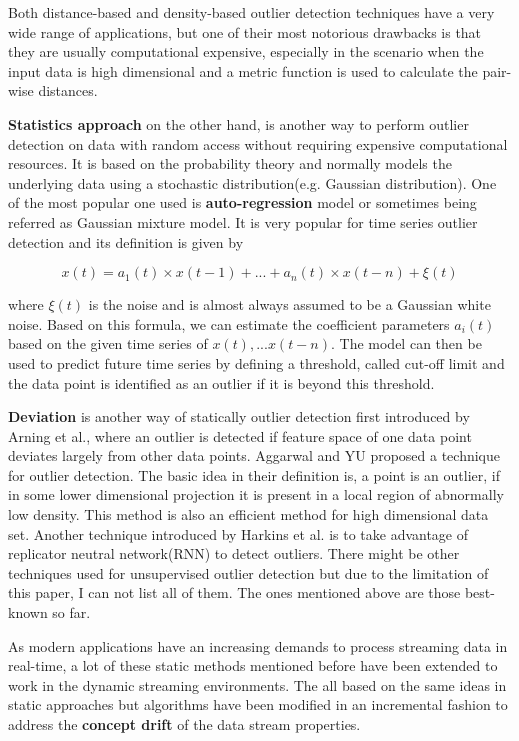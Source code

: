 \documentclass[11pt]{article}       %
\begin{document}
Both distance-based and density-based outlier detection techniques have a very wide range of applications, but one of their most notorious drawbacks is that they are usually computational expensive, especially in the scenario when the input data is high dimensional and a metric function is used to calculate the pair-wise distances.  

\textbf{Statistics approach} on the other hand, is another way to perform outlier detection on data with random access without requiring expensive computational resources. It is based on the probability theory and normally models the underlying data using a stochastic distribution(e.g. Gaussian distribution). One of the most popular one used is \textbf{auto-regression} model or sometimes being referred as Gaussian mixture model\cite{4438332}. It is very popular for time series outlier detection and its definition is given by 

\[ x(t) = a_{1}(t) \times x(t-1) + ... + a_{n}(t) \times x(t -n) + \xi(t) \]

where $\xi(t)$ is the noise and is almost always assumed to be a Gaussian white noise. Based on this formula, we can estimate the coefficient parameters $a_{i}(t)$ based on the given time series of $x(t),...x(t-n)$. The model can then be used to predict future time series by defining a threshold, called cut-off limit and the data point is identified as an outlier if it is beyond this threshold.

\textbf{Deviation} is another way of statically outlier detection first introduced by Arning et al.\cite{A.Arning:deviation}, where an outlier is detected if feature space of one data point deviates largely from other data points. Aggarwal and YU\cite{Aggarwal:2001:ODH:375663.375668} proposed a technique for outlier detection. The basic idea in their definition is, a point is an outlier, if in some lower dimensional projection it is present in a local region of abnormally low density. This method is also an efficient method for high dimensional data set\cite{04666541}. Another technique introduced by Harkins et al.\cite{S.Harkins:rnn} is to take advantage of replicator neutral network(RNN) to detect outliers. There might be other techniques used for unsupervised outlier detection but due to the limitation of this paper, I can not list all of them. The ones mentioned above are those best-known so far.

As modern applications have an increasing demands to process streaming data in real-time, a lot of these static methods mentioned before have been extended to work in the dynamic streaming environments. The all based on the same ideas in static approaches but algorithms have been modified in an incremental fashion to address the \textbf{concept drift} of the data stream properties.
\end{document}

